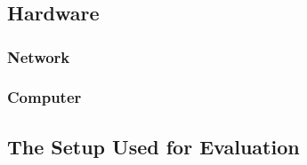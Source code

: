 \chapter{}
\label{sec:results}




\section{Hardware}


\subsection{Network}


\subsection{Computer}




\section{The Setup Used for Evaluation}

